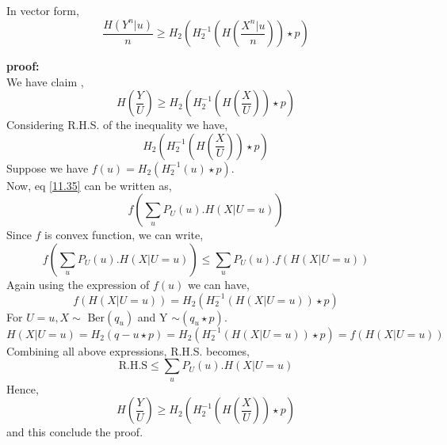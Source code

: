 \documentclass{article}
\begin{document}
In vector form,
\begin{equation}
	\frac{H\left( Y^{n}|u \right)}{n} \geq H_2\left( H_{2}^{-1}\left( H\left(\frac{ X^{n}|u}{n}\right)\right) \star p\right)
\end{equation}

\textbf{proof:} \\
We have claim ,
\begin{equation}
	H\left(\frac{Y}{U}\right) \geq H_2\left( H_{2}^{-1}\left( H\left( \frac{X}{U}\right)\right) \star p\right)
\end{equation}
Considering R.H.S. of the inequality we have, 
\begin{equation}
 H_2\left( H_{2}^{-1}\left( H\left( \frac{X}{U}\right)\right) \star p\right) \label{11.35}
\end{equation}
Suppose we have $f(u) = H_{2} \left( H_{2}^{-1}(u)\star p\right)$.\\
Now, eq \ref{11.35} can be written as, 
\begin{equation}
f \left( \sum_{u} P_{U}(u). H \left( X | U = u\right)\right)
\end{equation}
Since $f$ is convex function, we can write,
\begin{equation}
f \left( \sum_{u} P_{U}(u). H \left( X | U = u\right)\right) \leq   \sum_{u} P_{U}(u). f \left(H \left( X | U = u\right)\right) 
\end{equation}
Again using the expression of $f(u)$ we can have,
\begin{equation}
	f\left(H\left( X|U=u\right)\right) =  H_{2} \left( H_{2}^{-1}\left(H\left( X|U=u\right)\right)\star p\right)
\end{equation}
 For $U = u, X \sim $ Ber$(q_{u})$ and Y $\sim (q_{u} \star p)$.
 \begin{equation}
 H\left( X|U=u\right) = H_{2}\left(q-{u} \star p\right) = H_{2} \left( H_{2}^{-1}\left(H\left( X|U=u\right)\right)\star p\right) = 	f\left(H\left( X|U=u\right)\right)
 \end{equation} 
Combining all above expressions, R.H.S. becomes, 
\begin{equation}
	\text{R.H.S} \leq  \sum_{u} P_{U}(u). H \left( X | U = u\right)
\end{equation}
Hence,
\begin{equation}
	H\left(\frac{Y}{U}\right) \geq H_2\left( H_{2}^{-1}\left( H\left( \frac{X}{U}\right)\right) \star p\right)
\end{equation}
and this conclude the proof.
\end{document}
